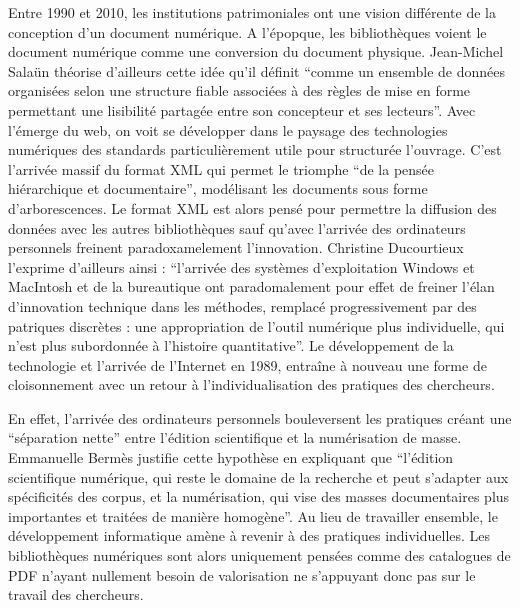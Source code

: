 Entre 1990 et 2010, les institutions patrimoniales ont une vision différente de la conception d'un document numérique. A l'épopque, les bibliothèques voient le document numérique comme une conversion du document physique. Jean-Michel Salaün théorise d'ailleurs cette idée qu'il définit \enquote{comme un ensemble de données organisées selon une structure fiable associées à des règles de mise en forme permettant une lisibilité partagée entre son concepteur et ses lecteurs}. Avec l'émerge du web, on voit se développer dans le paysage des technologies numériques des standards particulièrement utile pour structurée l'ouvrage. C'est l'arrivée massif du format XML qui permet le triomphe \enquote{de la pensée hiérarchique et documentaire}, modélisant les documents sous forme d'arborescences. Le format XML est alors pensé pour permettre la diffusion des données avec les autres bibliothèques sauf qu'avec l'arrivée des ordinateurs personnels freinent paradoxamelement l'innovation. Christine Ducourtieux l'exprime d'ailleurs ainsi : \enquote{l'arrivée des systèmes d'exploitation Windows et MacIntosh et de la bureautique ont paradomalement pour effet de freiner l'élan d'innovation technique dans les méthodes, remplacé progressivement par des patriques discrètes : une appropriation de l'outil numérique plus individuelle, qui n'est plus subordonnée à l'histoire quantitative}. Le développement de la technologie et l'arrivée de l'Internet en 1989, entraîne à nouveau une forme de cloisonnement avec un retour à l'individualisation des pratiques des chercheurs. 

En effet, l'arrivée des ordinateurs personnels bouleversent les pratiques créant une \enquote{séparation nette} entre l'édition scientifique et la numérisation de masse. Emmanuelle Bermès justifie cette hypothèse en expliquant que \enquote{l'édition scientifique numérique, qui reste le domaine de la recherche et peut s'adapter aux spécificités des corpus, et la numérisation, qui vise des masses documentaires plus importantes et traitées de manière homogène}. Au lieu de travailler ensemble, le développement informatique amène à revenir à des pratiques individuelles. Les bibliothèques numériques sont alors uniquement pensées comme des catalogues de PDF n'ayant nullement besoin de valorisation ne s'appuyant donc pas sur le travail des chercheurs. 

